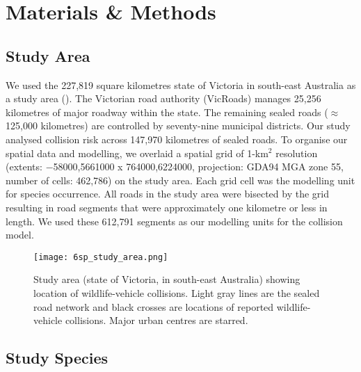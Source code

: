 \section{Materials \& Methods}

\subsection{Study Area}

We used the 227,819 square kilometres state of Victoria in south-east Australia as a study area (). The Victorian road authority (VicRoads) manages 25,256 kilometres of major roadway within the state. The remaining sealed roads ($\approx$ 125,000 kilometres) are controlled by seventy-nine municipal districts. Our study analysed collision risk across 147,970 kilometres of sealed roads. To organise our spatial data and modelling, we overlaid a spatial grid of 1-km$^2$ resolution (extents: $-$58000,5661000 x 764000,6224000, projection: GDA94 MGA zone 55, number of cells: 462,786) on the study area. Each grid cell was the modelling unit for species occurrence. All roads in the study area were bisected by the grid resulting in road segments that were approximately one kilometre or less in length. We used these 612,791 segments as our modelling units for the collision model.

\begin{figure*}[!t]
  \centering
  \texttt{[image: 6sp\_study\_area.png]}
  \caption[Wildlife-vehicle collisions in Victoria]{Study area (state of Victoria, in south-east Australia) showing location of wildlife-vehicle collisions. Light gray lines are the sealed road network and black crosses are locations of reported wildlife-vehicle collisions. Major urban centres are starred.}
  \label{6sp_study_area}
\end{figure*}

\subsection{Study Species}

